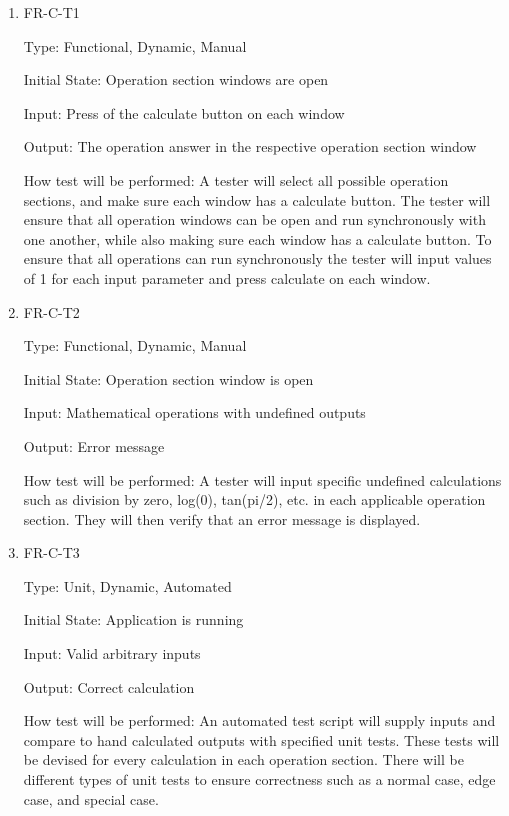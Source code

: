 \documentclass[12pt, titlepage]{article}
\begin{document}
\begin{enumerate}

\item{FR-C-T1\\}

Type: Functional, Dynamic, Manual
					
Initial State: Operation section windows are open
					
Input: Press of the calculate button on each window
					
Output: The operation answer in the respective operation section window
					
How test will be performed: A tester will select all possible operation sections, and make sure each window has a calculate button. The tester will ensure that all operation windows can be open and run synchronously with one another, while also making sure each window has a calculate button. To ensure that all operations can run synchronously the tester will input values of 1 for each input parameter and press calculate on each window.
					
\item{FR-C-T2\\}

Type: Functional, Dynamic, Manual
					
Initial State: Operation section window is open 
					
Input: Mathematical operations with undefined outputs
					
Output: Error message

How test will be performed: A tester will input specific undefined calculations such as division by zero, log(0), tan(pi/2), etc. in each applicable operation section. They will then verify that an error message is displayed.


\item{FR-C-T3\\}

Type: Unit, Dynamic, Automated
					
Initial State: Application is running
					
Input: Valid arbitrary inputs
					
Output: Correct calculation

How test will be performed: An automated test script will supply inputs and compare to hand calculated outputs with specified unit tests. These tests will be devised for every calculation in each operation section. There will be different types of unit tests to ensure correctness such as a normal case, edge case, and special case.

\end{enumerate}
\end{document}
